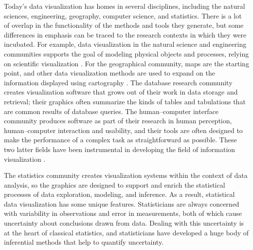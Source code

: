 
Today's data visualization has homes in several disciplines, including
the natural sciences, engineering, geography, computer science, and
statistics.  There is a lot of overlap in the functionality of the
methods and tools they generate, but some differences in emphasis can
be traced to the research contexts in which they were incubated.  For
example, data visualization in the natural science and engineering
communities supports the goal of modeling physical objects and
processes, relying on scientific visualization
\cite{Hansen2004,Bonneau2006}. For the geographical community, maps
are the starting point, and other data visualization methods are used
to expand on the information displayed using cartography
\cite{LMGR05,DMK05}.  The database research community creates
visualization software that grows out of their work in data storage and
retrieval; their graphics often summarize the kinds of tables and
tabulations that are common results of database queries.  The
human--computer interface community produces software as part of their
research in human perception, human--computer interaction and
usability, and their tools are often designed to make the performance
of a complex task as straightforward as possible. These two latter
fields have been instrumental in developing the field of information
visualization \cite{CMS99,BS03,Spence07}.



The statistics community creates visualization systems within the
context of data analysis, so the graphics are designed to support and
enrich the statistical processes of data exploration, modeling, and
inference.
As a result, statistical data visualization has some unique features.
Statisticians are always concerned with variability in observations
and error in measurements, both of which cause uncertainty about
conclusions drawn from data.  Dealing with this uncertainty is at the
heart of classical statistics, and statisticians have developed a huge
body of inferential methods that help to quantify uncertainty.

